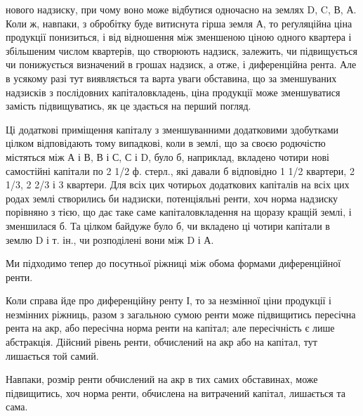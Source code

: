 \parcont{}  %
нового надзиску, при чому воно може відбутися одночасно на землях D, C, В, А.
Коли ж, навпаки, з обробітку буде витиснута гірша земля А, то реґуляційна
ціна продукції понизиться, і від відношення між зменшеною ціною одного
квартера і збільшеним числом квартерів, що створюють надзиск, залежить, чи
підвищується чи понижується визначений в грошах надзиск, а отже, і диференційна
рента. Але в усякому разі тут виявляється та варта уваги обставина,
що за зменшуваних надзисків з послідовних капіталовкладень, ціна продукції
може зменшуватися замість підвищуватись, як це здається на перший погляд.

Ці додаткові приміщення капіталу з зменшуванними додатковими здобутками
цілком відповідають тому випадкові, коли в землі, що за своєю родючістю
містяться між А і В, В і С, С і D, було б, наприклад, вкладено чотири нові
самостійні капітали по 2 1/2 ф. стерл., які давали б відповідно 1 1/2 квартери,
2 1/3, 2 2/3 і 3 квартери. Для всіх цих чотирьох додаткових капіталів на всіх
цих родах землі створились би надзиски, потенціяльні ренти, хоч норма надзиску
порівняно з тією, що дає таке саме капіталовкладення на щоразу кращій землі,
і зменшилася б. Та цілком байдуже було б, чи вкладено ці чотири капітали
в землю D і т. ін., чи розподілені вони між D і А.

Ми підходимо тепер до посутньої ріжниці між обома формами диференційної
ренти.

Коли справа йде про диференційну ренту І, то за незмінної ціни продукції
і незмінних ріжниць, разом з загальною сумою ренти може підвищитись
пересічна рента на акр, або пересічна норма ренти на капітал; але пересічність
є лише абстракція. Дійсний рівень ренти, обчислений на акр або на капітал,
тут лишається той самий.

Навпаки, розмір ренти обчислений на акр в тих самих обставинах, може
підвищитись, хоч норма ренти, обчислена на витрачений капітал, лишається
та сама.

